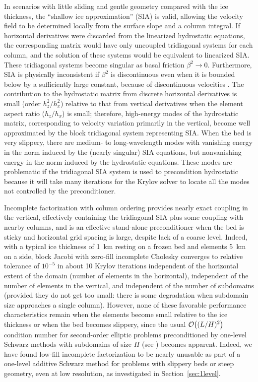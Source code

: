 In scenarios with little sliding and gentle geometry compared with the ice thickness, the ``shallow ice approximation'' (SIA) is valid, allowing the velocity field to be determined locally from the surface slope and a column integral.
If horizontal derivatives were discarded from the linearized hydrostatic equations, the corresponding matrix would have only uncoupled tridiagonal systems for each column, and the solution of these systems would be equivalent to linearized SIA.
These tridiagonal systems become singular as basal friction $\beta^2 \to 0$.
Furthermore, SIA is physically inconsistent if $\beta^2$ is discontinuous even when it is bounded below by a sufficiently large constant, because of discontinuous velocities \citep{fowler2001modelling}.
The contribution to the hydrostatic matrix from discrete horizontal derivatives is small (order $h_z^2/h_x^2$) relative to that from vertical derivatives when the element aspect ratio ($h_z/h_x$) is small; therefore, high-energy modes of the hydrostatic matrix, corresponding to velocity variation primarily in the vertical, become well approximated by the block tridiagonal system representing SIA.
When the bed is very slippery, there are medium- to long-wavelength modes with vanishing energy in the norm induced by the (nearly singular) SIA equations, but nonvanishing energy in the norm induced by the hydrostatic equations.
These modes are problematic if the tridiagonal SIA system is used to precondition hydrostatic because it will take many iterations for the Krylov solver to locate all the modes not controlled by the preconditioner.

Incomplete factorization with column ordering provides nearly exact coupling in the vertical, effectively containing the tridiagonal SIA plus some coupling with nearby columns, and is an effective stand-alone preconditioner when the bed is sticky and horizontal grid spacing is large, despite lack of a coarse level.
Indeed, with a typical ice thickness of \SI{1}{\kilo\metre} resting on a frozen bed and elements \SI{5}{\kilo\metre} on
a side, block Jacobi with zero-fill incomplete Cholesky converges to relative tolerance of $10^{-5}$
in about 10 Krylov iterations independent of the horizontal extent of the domain (number of elements
in the horizontal), independent of the number of elements in the vertical, and independent of the
number of subdomains (provided they do not get too small: there is some degradation when subdomain
size approaches a single column).  However, none of these favorable performance characteristics
remain when the elements become small relative to the ice thickness or when the bed becomes
slippery, since the usual ${\mathcal{O}}\big((L/H)^2\big)$ condition number for second-order elliptic problems
preconditioned by one-level Schwarz methods with subdomains of size $H$ (see \citet{smith1996domain}) becomes apparent.
Indeed, we have found low-fill incomplete factorization to be nearly unusable as part of a one-level additive Schwarz method for problems with slippery beds or steep geometry, even at low resolution, as investigated in Section~\ref{sec:1level}.

